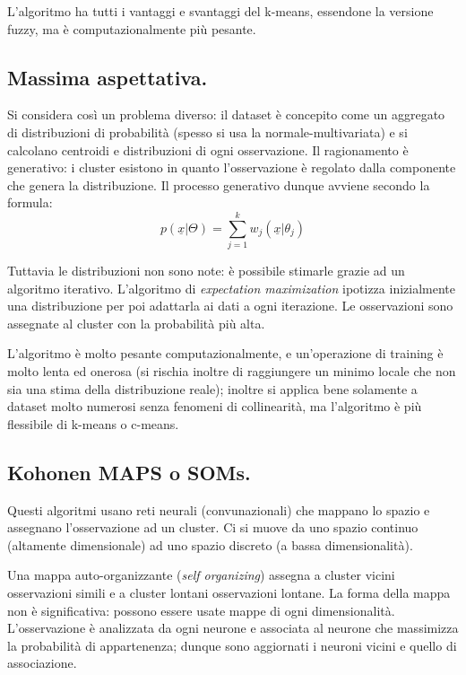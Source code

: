 \documentclass[11pt, a4page, twocolumn]{article}
\begin{document}
L'algoritmo ha tutti i vantaggi e svantaggi del k-means, essendone la versione fuzzy, ma è computazionalmente più pesante.

\subsection{Massima aspettativa.}
Si considera così un problema diverso: il dataset è concepito come un aggregato di distribuzioni di probabilità (spesso si usa la normale-multivariata) e si calcolano centroidi e distribuzioni di ogni osservazione.
Il ragionamento è generativo: i cluster esistono in quanto l'osservazione è regolato dalla componente che genera la distribuzione.
Il processo generativo dunque avviene secondo la formula:
\begin{equation*}
p(\underline{x}|\Theta) = \sum^k_{j=1}{w_j(\underline{x}|\theta_j)}
\end{equation*}

Tuttavia le distribuzioni non sono note: è possibile stimarle grazie ad un algoritmo iterativo.
L'algoritmo di \textit{expectation maximization} ipotizza inizialmente una distribuzione per poi adattarla ai dati a ogni iterazione.
Le osservazioni sono assegnate al cluster con la probabilità più alta.

L'algoritmo è molto pesante computazionalmente, e un'operazione di training è molto lenta ed onerosa (si rischia inoltre di raggiungere un minimo locale che non sia una stima della distribuzione reale); inoltre si applica bene solamente a dataset molto numerosi senza fenomeni di collinearità, ma l'algoritmo è più flessibile di k-means o c-means.

\subsection{Kohonen MAPS o SOMs.}
Questi algoritmi usano reti neurali (convunazionali) che mappano lo spazio e assegnano l'osservazione ad un cluster.
Ci si muove da uno spazio continuo (altamente dimensionale) ad uno spazio discreto (a bassa dimensionalità).

Una mappa auto-organizzante (\textit{self organizing}) assegna a cluster vicini osservazioni simili e a cluster lontani osservazioni lontane.
La forma della mappa non è significativa: possono essere usate mappe di ogni dimensionalità.
L'osservazione è analizzata da ogni neurone e associata al neurone che massimizza la probabilità di appartenenza; dunque sono aggiornati i neuroni vicini e quello di associazione.
\end{document}
